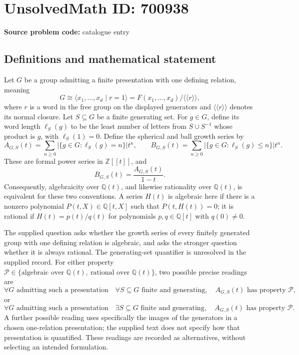 \documentclass[11pt]{article}
\newcommand{\Z}{\mathbb{Z}}
\newcommand{\Q}{\mathbb{Q}}
\begin{document}
\section*{UnsolvedMath ID: 700938}
\textbf{Source problem code:} catalogue entry
\subsection{Definitions and mathematical statement}
Let \(G\) be a group admitting a finite presentation with one defining relation, meaning
\[
G\cong \langle x_1,\ldots,x_d\mid r=1\rangle
=F(x_1,\ldots,x_d)/\langle\!\langle r\rangle\!\rangle,
\]
where \(r\) is a word in the free group on the displayed generators and \(\langle\!\langle r\rangle\!\rangle\) denotes its normal closure. Let \(S\subseteq G\) be a finite generating set. For \(g\in G\), define its word length \(\ell_S(g)\) to be the least number of letters from \(S\cup S^{-1}\) whose product is \(g\), with \(\ell_S(1)=0\). Define the spherical and ball growth series by
\[
A_{G,S}(t)=\sum_{n\geq0}\bigl|\{g\in G:\ell_S(g)=n\}\bigr|t^n,
\qquad
B_{G,S}(t)=\sum_{n\geq0}\bigl|\{g\in G:\ell_S(g)\leq n\}\bigr|t^n.
\]
These are formal power series in \(\Z[[t]]\), and
\[
B_{G,S}(t)=\frac{A_{G,S}(t)}{1-t}.
\]
Consequently, algebraicity over \(\Q(t)\), and likewise rationality over \(\Q(t)\), is equivalent for these two conventions. A series \(H(t)\) is algebraic here if there is a nonzero polynomial \(P(t,X)\in\Q[t,X]\) such that \(P(t,H(t))=0\); it is rational if \(H(t)=p(t)/q(t)\) for polynomials \(p,q\in\Q[t]\) with \(q(0)\neq0\).

The supplied question asks whether the growth series of every finitely generated group with one defining relation is algebraic, and asks the stronger question whether it is always rational. The generating-set quantifier is unresolved in the supplied record. For either property \(\mathcal P\in\{\text{algebraic over }\Q(t),\ \text{rational over }\Q(t)\}\), two possible precise readings are
\[
\forall G\text{ admitting such a presentation}\quad
\forall S\subseteq G\text{ finite and generating},\quad
A_{G,S}(t)\text{ has property }\mathcal P,
\]
or
\[
\forall G\text{ admitting such a presentation}\quad
\exists S\subseteq G\text{ finite and generating},\quad
A_{G,S}(t)\text{ has property }\mathcal P.
\]
A further possible reading uses specifically the images of the generators in a chosen one-relation presentation; the supplied text does not specify how that presentation is quantified. These readings are recorded as alternatives, without selecting an intended formulation.
\end{document}
